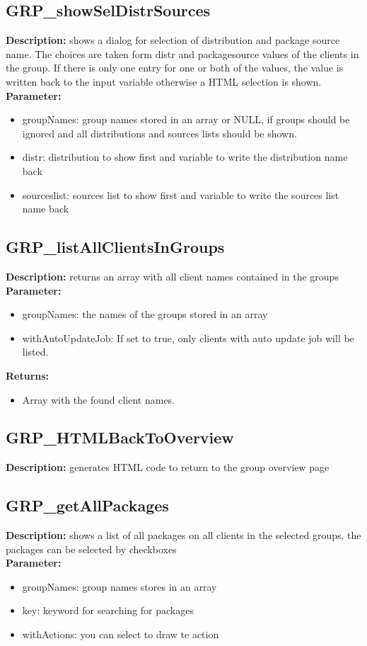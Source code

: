 \subsection{GRP\_showSelDistrSources}
\textbf{Description:} shows a dialog for selection of distribution and package source name. The choices are taken form distr and packagesource values of the clients in the group. If there is only one entry for one or both of the values, the value is written back to the input variable otherwise a HTML selection is shown.\\
\textbf{Parameter:}
\begin{itemize}
\item groupNames: group names stored in an array or NULL, if groups should be ignored and all distributions and sources lists should be shown.
\item distr: distribution to show first and variable to write the distribution name back
\item sourceslist: sources list to show first and variable to write the sources list name back
\end{itemize}

\subsection{GRP\_listAllClientsInGroups}
\textbf{Description:} returns an array with all client names contained in the groups\\
\textbf{Parameter:}
\begin{itemize}
\item groupNames: the names of the groups stored in an array
\item withAutoUpdateJob: If set to true, only clients with auto update job will be listed.
\end{itemize}
\textbf{Returns:}
\begin{itemize}
\item Array with the found client names.
\end{itemize}

\subsection{GRP\_HTMLBackToOverview}
\textbf{Description:} generates HTML code to return to the group overview page\\

\subsection{GRP\_getAllPackages}
\textbf{Description:} shows a list of all packages on all clients in the selected groups. the packages can be selected by checkboxes\\
\textbf{Parameter:}
\begin{itemize}
\item groupNames: group names stores in an array
\item key: keyword for searching for packages
\item withActions: you can select to draw te action 
\end{itemize}

